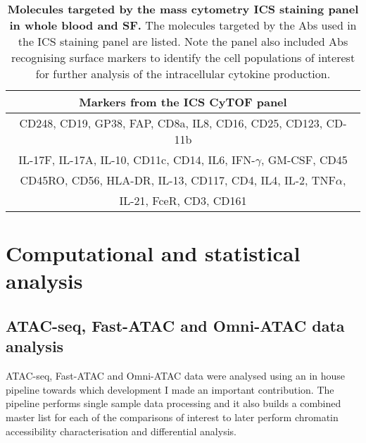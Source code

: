 \begin{table}[htbp]
\setlength{\tabcolsep}{20pt}
\renewcommand{\arraystretch}{1.5}
\begin{tabular}{@{} c}
\toprule
\textbf{Markers from the ICS CyTOF panel} \\
\midrule
\midrule
CD248, CD19, GP38, FAP, CD8a, IL8, CD16, CD25, CD123, CD-11b \\
IL-17F, IL-17A, IL-10, CD11c, CD14, IL6, IFN-$\gamma$, GM-CSF, CD45\\
CD45RO, CD56, HLA-DR, IL-13, CD117, CD4, IL4, IL-2, TNF$\alpha$,\\
IL-21, FceR, CD3, CD161\\
\bottomrule
\end{tabular}
\medskip %
\caption[Molecules targeted by the mass cytometry ICS staining panel in whole blood and SF.]{\textbf{Molecules targeted by the mass cytometry ICS staining panel in whole blood and SF.} The molecules targeted by the Abs used in the ICS staining panel are listed. Note the panel also included Abs recognising surface markers to identify the cell populations of interest for further analysis of the intracellular cytokine production.}
\label{tab:CyTOF}
\end{table}
\bigskip %


\section{Computational and statistical analysis}

\subsection{ATAC-seq, Fast-ATAC and Omni-ATAC data analysis}
\label{ATAC_analysis}
ATAC-seq, Fast-ATAC and Omni-ATAC data were analysed using an in house pipeline towards which development I made an important contribution. The pipeline performs single sample data processing and it also builds a combined master list for each of the comparisons of interest to later perform chromatin accessibility characterisation and differential analysis. 

